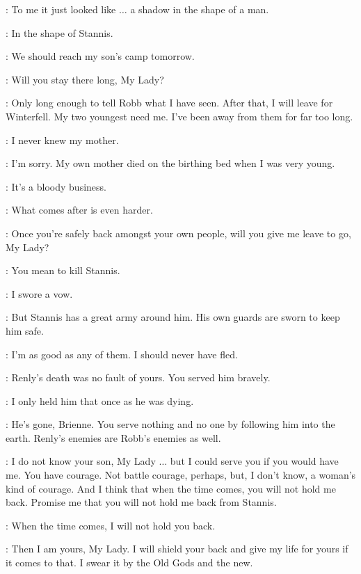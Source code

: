 \CATELYN: To me it just looked like $\ldots$ a shadow in the shape of a man. 

\BRIENNE: In the shape of Stannis. 

\CATELYN: We should reach my son's camp tomorrow. 

\BRIENNE: Will you stay there long, My Lady? 

\CATELYN: Only long enough to tell Robb what I have seen. After that, I will leave for Winterfell. My two youngest need me. I've been away from them for far too long. 

\BRIENNE: I never knew my mother. 

\CATELYN: I'm sorry. My own mother died on the birthing bed when I was very young. 

\BRIENNE: It's a bloody business. 

\CATELYN: What comes after is even harder. 

\BRIENNE: Once you're safely back amongst your own people, will you give me leave to go, My Lady? 

\CATELYN: You mean to kill Stannis. 

\BRIENNE: I swore a vow. 

\CATELYN: But Stannis has a great army around him. His own guards are sworn to keep him safe. 

\BRIENNE: I'm as good as any of them. I should never have fled. 

\CATELYN: Renly's death was no fault of yours. You served him bravely. 

\BRIENNE: I only held him that once as he was dying. 

\CATELYN: He's gone, Brienne. You serve nothing and no one by following him into the earth. Renly's enemies are Robb's enemies as well. 

\BRIENNE: I do not know your son, My Lady $\ldots$ but I could serve you if you would have me. You have courage. Not battle courage, perhaps, but, I don't know, a woman's kind of courage. And I think that when the time comes, you will not hold me back. Promise me that you will not hold me back from Stannis. 

\CATELYN: When the time comes, I will not hold you back. 


\BRIENNE: Then I am yours, My Lady. I will shield your back and give my life for yours if it comes to that. I swear it by the Old Gods and the new. 

